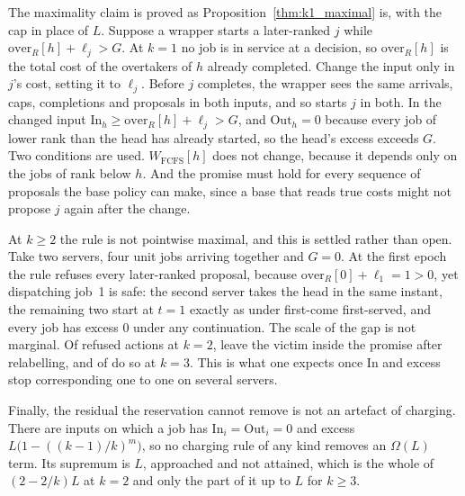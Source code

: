 The maximality claim is proved as Proposition~\ref{thm:k1_maximal} is, with the cap
in place of $L$. Suppose a wrapper starts a later-ranked $j$ while
$\mathrm{over}_R[h]+\ell_j>G$. At $k=1$ no job is in service at a decision, so
$\mathrm{over}_R[h]$ is the total cost of the overtakers of $h$ already completed.
Change the input only in $j$'s cost, setting it to $\ell_j$. Before $j$ completes, the
wrapper sees the same arrivals, caps, completions and proposals in both inputs, and so
starts $j$ in both. In the changed input
$\mathrm{In}_h\geq\mathrm{over}_R[h]+\ell_j>G$, and $\mathrm{Out}_h=0$ because every job
of lower rank than the head has already started, so the head's excess exceeds $G$. Two
conditions are used. $W_{\mathrm{FCFS}}[h]$ does not change, because it depends only on
the jobs of rank below $h$. And the promise must hold for every sequence of proposals the
base policy can make, since a base that reads true costs might not propose $j$ again after
the change.

At $k \ge 2$ the rule is not pointwise maximal, and this is settled rather than open.
Take two servers, four unit jobs arriving together and $G=0$. At the first epoch the rule
refuses every later-ranked proposal, because $\mathrm{over}_R[0]+\ell_1 = 1 > 0$, yet
dispatching job~1 is safe: the second server takes the head in the same instant, the
remaining two start at $t=1$ exactly as under first-come first-served, and every job has
excess $0$ under any continuation. The scale of the gap is not marginal. Of
 refused actions at $k=2$,  leave the victim inside
the promise after relabelling, and  of  do so at
$k=3$. This is what one expects once $\mathrm{In}$ and excess stop corresponding one to
one on several servers.

Finally, the residual the reservation cannot remove is not an artefact of charging. There
are inputs on which a job has $\mathrm{In}_i=\mathrm{Out}_i=0$ and excess
$L\bigl(1-((k-1)/k)^m\bigr)$, so no charging rule of any kind removes an $\Omega(L)$
term. Its supremum is $L$, approached and not attained, which is the whole of
$(2-2/k)L$ at $k=2$ and only the part of it up to $L$ for $k \ge 3$.


